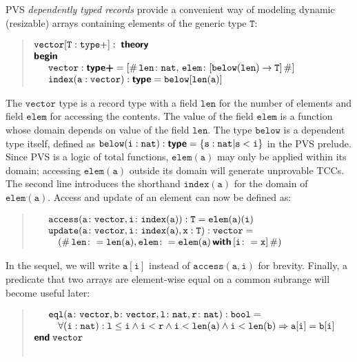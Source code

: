 \documentclass[english,submission]{eptcs}
\begin{document}
PVS\emph{ dependently typed records} provide a convenient way of modeling
dynamic (resizable) arrays containing elements of the generic type
$\mathtt{T}$:
\begin{quote}
$\begin{array}[t]{@{}l}
\mathtt{vector[T:type+]}:\;\textsf{\textbf{theory}}\\
\textsf{\textbf{begin}}\\
\quad\begin{array}[t]{l}
\mathtt{vector:\textsf{\textbf{type+}}=[\#\, len\colon nat,\, elem\colon[below(len)\rightarrow T]\,\#]}\\
\mathtt{index(a:vector)}:\textsf{\textbf{type}}=\mathtt{below[len(a)]}
\end{array}
\end{array}$
\end{quote}
\noindent The $\mathtt{vector}$ type is a record type with a field
$\mathtt{len}$ for the number of elements and field $\mathtt{elem}$
for accessing the contents. The value of the field $\mathtt{elem}$
is a function whose domain depends on value of the field $\mathtt{len}$.
The type $\mathtt{below}$ is a dependent type itself, defined as
$\mathtt{below(i:nat):\textsf{\textbf{type}}=\{s:nat|s<i\}}$ in the
PVS prelude. Since PVS is a logic of total functions, $\mathtt{elem(a)}$
may only be applied within its domain; accessing $\mathtt{elem(a)}$
outside its domain will generate unprovable TCCs. The second line
introduces the shorthand $\mathtt{index(a)}$ for the domain of $\mathtt{elem(a)}$.
Access and update of an element can now be defined as:
\begin{quote}
$\begin{array}[t]{@{}l}
\quad\begin{array}[t]{l}
\mathtt{access(a\colon\mathtt{vector},i\colon index(a)):T=elem(a)(i)}\\
\mathtt{update(a\colon\mathtt{vector},i\colon index(a),x:T):vector=}\\
\quad\mathtt{(\#\, len\colon=len(a),elem\colon=elem(a)\,\textsf{\textbf{with}}\,[i\colon=x]\,\#)}
\end{array}\end{array}$
\end{quote}
In the sequel, we will write $\mathtt{a[i]}$ instead of $\mathtt{access(a,i)}$
for brevity. Finally, a predicate that two arrays are element-wise
equal on a common subrange will become useful later:
\begin{quote}
$\begin{array}[t]{@{}l}
\quad\begin{array}[t]{l}
\mathtt{eql(a\colon\mathtt{vector},b\colon\mathtt{vector},l\colon nat,r\colon nat):bool}=\\
\quad\mathtt{\forall(i:nat):l\le i\land i<r\land i<len(a)\land i<len(b)\Rightarrow a[i]=b[i]}\\
\end{array}\\
\textsf{\textbf{end}}\;\mathtt{vector}\\
\\
\end{array}$
\end{quote}
\end{document}
